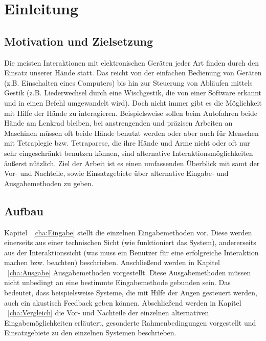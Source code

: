 \chapter{Einleitung}
\label{cha:Einleitung}

\section{Motivation und Zielsetzung}
%
Die meisten Interaktionen mit elektronischen Geräten jeder Art finden durch den Einsatz unserer Hände statt. Das reicht von der einfachen Bedienung von Geräten (z.B. Einschalten eines Computers) bis hin zur Steuerung von Abläufen mittels Gestik (z.B. Liederwechsel durch eine Wischgestik, die von einer Software erkannt und in einen Befehl umgewandelt wird). Doch nicht immer gibt es die Möglichkeit mit Hilfe der Hände zu interagieren. Beispielsweise sollen beim Autofahren beide Hände am Lenkrad bleiben, bei anstrengenden und präzisen Arbeiten an Maschinen müssen oft beide Hände benutzt werden oder aber auch für Menschen mit Tetraplegie bzw. Tetraparese, die ihre Hände und Arme nicht oder oft nur sehr eingeschränkt benutzen können, sind alternative Interaktionsmöglichkeiten äußerst nützlich.
\newline \newline
Ziel der Arbeit ist es einen umfassenden Überblick mit samt der Vor- und Nachteile, sowie Einsatzgebiete über alternative Eingabe- und Ausgabemethoden zu geben.

\section{Aufbau}
Kapitel ~\ref{cha:Eingabe} stellt die einzelnen Eingabemethoden vor. Diese werden einerseits aus einer technischen Sicht (wie funktioniert das System), andererseits aus der Interaktionssicht (was muss ein Benutzer für eine erfolgreiche Interaktion machen bzw. beachten) beschrieben.
\newline \newline
Anschließend werden in Kapitel ~\ref{cha:Ausgabe} Ausgabemethoden vorgestellt. Diese Ausgabemethoden müssen nicht unbedingt an eine bestimmte Eingabemethode gebunden sein. Das bedeutet, dass beispielsweise Systeme, die mit Hilfe der Augen gesteuert werden, auch ein akustisch Feedback geben können. 
\newline \newline
Abschließend werden in Kapitel ~\ref{cha:Vergleich} die Vor- und Nachteile der einzelnen alternativen Eingabemöglichkeiten erläutert, gesonderte Rahmenbedingungen vorgestellt und Einsatzgebiete zu den einzelnen Systemen beschrieben.





